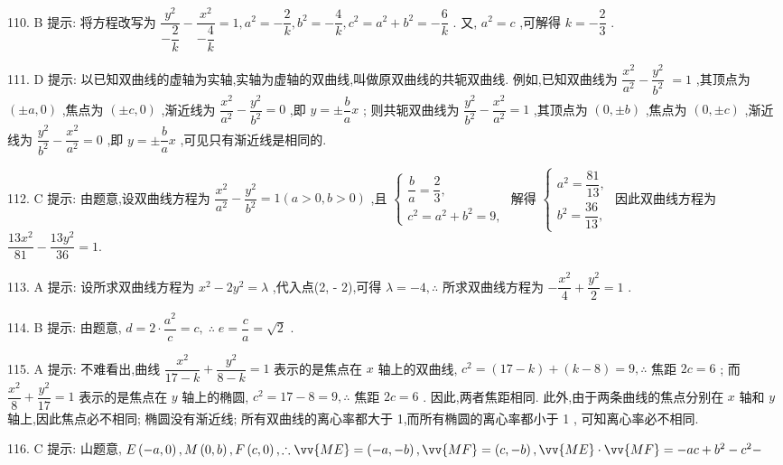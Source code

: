 110. B 提示: 将方程改写为 $\dfrac{{y}^{2}}{-\dfrac{2}{k}} - \dfrac{{x}^{2}}{-\dfrac{4}{k}} = 1,{a}^{2} =  - \dfrac{2}{k},{b}^{2} =  - \dfrac{4}{k},{c}^{2} = {a}^{2} + {b}^{2} =  - \dfrac{6}{k}$ . 又, ${a}^{2} = c$ ,可解得 $k =  - \dfrac{2}{3}$ .

111. D 提示: 以已知双曲线的虚轴为实轴,实轴为虚轴的双曲线,叫做原双曲线的共轭双曲线. 例如,已知双曲线为 $\dfrac{{x}^{2}}{{a}^{2}} - \dfrac{{y}^{2}}{{b}^{2}}$  $= 1$ ,其顶点为 $\left( {\pm a,0}\right)$ ,焦点为 $\left( {\pm c,0}\right)$ ,渐近线为 $\dfrac{{x}^{2}}{{a}^{2}} - \dfrac{{y}^{2}}{{b}^{2}} = 0$ ,即 $y =  \pm  \dfrac{b}{a}x$ ; 则共轭双曲线为 $\dfrac{{y}^{2}}{{b}^{2}} - \dfrac{{x}^{2}}{{a}^{2}} = 1$ ,其顶点为 $\left( {0, \pm  b}\right)$ ,焦点为 $\left( {0, \pm  c}\right)$ ,渐近线为 $\dfrac{{y}^{2}}{{b}^{2}} - \dfrac{{x}^{2}}{{a}^{2}} = 0$ ,即 $y =  \pm  \dfrac{b}{a}x$ ,可见只有渐近线是相同的.

112. C 提示: 由题意,设双曲线方程为 $\dfrac{{x}^{2}}{{a}^{2}} - \dfrac{{y}^{2}}{{b}^{2}} = 1\left( {a > 0,b > 0}\right)$ ,且 $\left\{  \begin{array}{l} \dfrac{b}{a} = \dfrac{2}{3}, \\  {c}^{2} = {a}^{2} + {b}^{2} = 9, \end{array}\right.$ 解得 $\left\{  \begin{array}{l} {a}^{2} = \dfrac{81}{13}, \\  {b}^{2} = \dfrac{36}{13}, \end{array}\right.$ 因此双曲线方程为 $\dfrac{{13}{x}^{2}}{81} - \dfrac{{13}{y}^{2}}{36} = 1.$

113. A 提示: 设所求双曲线方程为 ${x}^{2} - 2{y}^{2} = \lambda$ ,代入点(2, - 2),可得 $\lambda  =  - 4,\therefore$ 所求双曲线方程为 $- \dfrac{{x}^{2}}{4} + \dfrac{{y}^{2}}{2} = 1$ .

114. B 提示: 由题意, $d = 2 \cdot  \dfrac{{a}^{2}}{c} = c,\;\therefore \;e = \dfrac{c}{a} = \sqrt{2}$ .

115. A 提示: 不难看出,曲线 $\dfrac{{x}^{2}}{{17} - k} + \dfrac{{y}^{2}}{8 - k} = 1$ 表示的是焦点在 $x$ 轴上的双曲线, ${c}^{2} = \left( {{17} - k}\right)  + \left( {k - 8}\right)  = 9,\therefore$ 焦距 ${2c} = 6$ ; 而 $\dfrac{{x}^{2}}{8} + \dfrac{{y}^{2}}{17} = 1$ 表示的是焦点在 $y$ 轴上的椭圆, ${c}^{2} = {17} - 8 = 9,\therefore$ 焦距 ${2c} = 6$ . 因此,两者焦距相同. 此外,由于两条曲线的焦点分别在 $x$ 轴和 $y$ 轴上,因此焦点必不相同; 椭圆没有渐近线; 所有双曲线的离心率都大于 1,而所有椭圆的离心率都小于 1 , 可知离心率必不相同.

116. C 提示: 山题意, $E\left( {-a,0}\right) ,M\left( {0,b}\right) ,F\left( {c,0}\right) ,\therefore \vv{ME} = \left( {-a, - b}\right) ,\vv{MF} = \left( {c, - b}\right) ,\vv{ME} \cdot  \vv{MF} =  - {ac} + {b}^{2} - {c}^{2} -$

